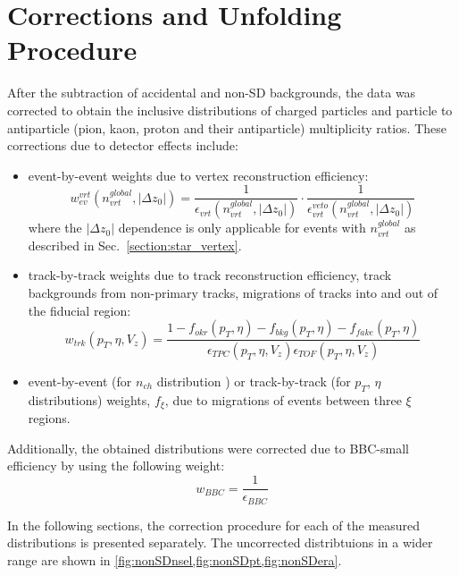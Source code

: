 \section{Corrections and Unfolding Procedure}\label{section:star_corrections}
After the subtraction of accidental and non-SD backgrounds, the data was corrected to obtain the inclusive distributions of charged particles and particle to antiparticle (pion, kaon, proton and their antiparticle) multiplicity ratios. These corrections due to detector effects include:
\begin{itemize}
	\item event-by-event weights due to vertex reconstruction efficiency:
\begin{equation}
w_{ev}^{vrt}\left(n_{vrt}^{global}, |\Delta z_0|\right)=\frac{1}{\epsilon_{vrt}\left(n_{vrt}^{global}, |\Delta z_0|\right)}\cdot\frac{1}{\epsilon_{vrt}^{veto}\left(n_{vrt}^{global}, |\Delta z_0|\right)}
\label{eq:vertexCorrection}
\end{equation}
where the 	$|\Delta z_0|$ dependence is only applicable for events with $n_{vrt}^{global}$ as described in Sec.~\ref{section:star_vertex}.
	\item track-by-track weights due to track reconstruction efficiency, track backgrounds from non-primary tracks, migrations of tracks into and out of the fiducial region:
\begin{equation}
w_{trk}\left(p_T,\eta,V_{z}\right)=\frac{1-f_{okr}\left(p_T,\eta\right)-f_{bkg}\left(p_T,\eta\right)-f_{fake}\left(p_T,\eta\right)}{\epsilon_{ TPC}\left(p_T,\eta,V_{z}\right)\epsilon_{ TOF}\left(p_T,\eta,V_{z}\right)}
\label{eq:trackCorrection}
\end{equation}
\item event-by-event (for $n_{ch}$ distribution ) or track-by-track (for $p_T$, $\eta$ distributions) weights, $f_{\xi}$, due to migrations of events between three $\xi$ regions.
\end{itemize}
Additionally, the obtained distributions were corrected due to BBC-small efficiency by using the following weight:
\begin{equation}
w_{BBC} = \frac{1}{\epsilon_{ BBC}}
\label{eq:bbcCorrection}
\end{equation} 

In the following sections, the correction procedure   for each of the measured distributions is presented separately.
The uncorrected distribtuions in a wider range  are shown in \cref{fig:nonSDnsel,fig:nonSDpt,fig:nonSDera}.





